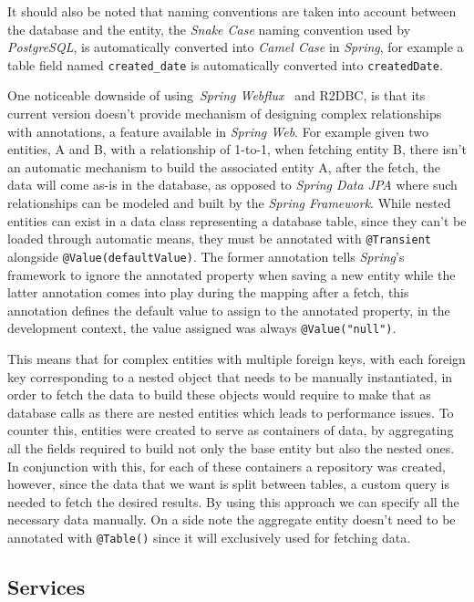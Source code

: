 It should also be noted that naming conventions are taken into account between the database and the entity, the \textit{Snake Case} naming convention used by \textit{PostgreSQL}, is automatically converted into \textit{Camel Case} in \textit{Spring}, for example a table field named \texttt{created\_date} is automatically converted into \texttt{createdDate}.

One noticeable downside of using~\textit{Spring Webflux}~\cite{spring-webflux} and R2DBC, is that its current version doesn't provide mechanism of designing complex relationships with annotations, a feature available in \textit{Spring Web}. For example given two entities, A and B, with a relationship of 1-to-1, when fetching entity B, there isn't an automatic mechanism to build the associated entity A, after the fetch, the data will come as-is in the database, as opposed to \textit{Spring Data JPA} where such relationships can be modeled and built by the \textit{Spring Framework}. 
While nested entities can exist in a data class representing a database table, since they can't be loaded through automatic means, they must be annotated with \texttt{@Transient} alongside \texttt{@Value(defaultValue)}. 
The former annotation tells \textit{Spring}'s framework to ignore the annotated property when saving a new entity while the latter annotation comes into play during the mapping after a fetch, this annotation defines the default value to assign to the annotated property, in the development context, the value assigned was always \texttt{@Value("null")}. 

This means that for complex entities with multiple foreign keys, with each foreign key corresponding to a nested object that needs to be manually instantiated, in order to fetch the data to build these objects would require to make that as database calls as there are nested entities which leads to performance issues. To counter this, entities were created to serve as containers of data, by aggregating all the fields required to build not only the base entity but also the nested ones. 
In conjunction with this, for each of these containers a repository was created, however, since the data that we want is split between tables, a custom query is needed to fetch the desired results. By using this approach we can specify all the necessary data manually. On a side note the aggregate entity doesn't need to be annotated with \texttt{@Table()} since it will exclusively used for fetching data.


\subsection{Services}

